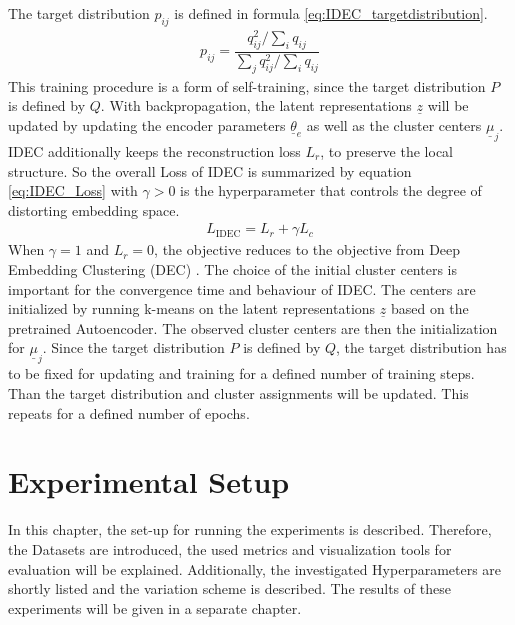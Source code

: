 \documentclass[12pt,DIV14,BCOR12mm,a4paper,footexclude,headinclude,halfparskip-,twoside,openright,cleardoubleempty,idxtotoc,bibtotoc,listtotoc]{scrreprt} %
\numberwithin{equation}{chapter}
\begin{document}
The target distribution $p_{ij}$ is defined in formula \ref{eq:IDEC_targetdistribution}.
\begin{align}
	p_{ij}=\dfrac{q_{ij}^{2}/\sum_i q_{ij}}{\sum_j q_{ij}^{2}/\sum_i q_{ij}}\label{eq:IDEC_targetdistribution}
\end{align}
This training procedure is a form of self-training, since the target distribution $P$ is defined by $Q$. With backpropagation, the latent representations $\underline{z}$ will be updated by updating the encoder parameters $\underline{\theta}_e$ as well as the cluster centers $\underline{\mu}_j$. IDEC additionally keeps the reconstruction loss $L_r$, to preserve the local structure. So the overall Loss of IDEC is summarized by equation \ref{eq:IDEC_Loss} with $\gamma > 0 $ is the hyperparameter that controls the degree of distorting embedding space.
\begin{align}
	L_{\textrm{IDEC}} = L_{r} + \gamma L_c\label{eq:IDEC_Loss}
\end{align}
When $\gamma = 1$ and $L_r = 0 $, the objective reduces to the objective from Deep Embedding Clustering (DEC) \cite{Xie16DEC}. The choice of the initial cluster centers is important for the convergence time and behaviour of IDEC. The centers are initialized by running k-means on the latent representations $\underline{z}$ based on the pretrained Autoencoder. The observed cluster centers are then the initialization for $\underline{\mu}_j$. Since the target distribution $P$ is defined by $Q$, the target distribution has to be fixed for updating and training for a defined number of training steps. Than the target distribution and cluster assignments will be updated. This repeats for a defined number of epochs.
\chapter{Experimental Setup}
In this chapter, the set-up for running the experiments is described. Therefore, the Datasets are introduced, the used metrics and visualization tools for evaluation will be explained. Additionally, the investigated Hyperparameters are shortly listed and the variation scheme is described. The results of these experiments will be given in a separate chapter.
\end{document}
